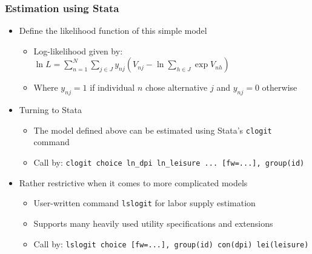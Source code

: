 \documentclass[handout,intlimits]{beamer}
\def\litc#1{\textcolor{med-gray}{\tiny\citep{#1}}}
\def\blue#1{\textcolor{zewblue}{#1}}
\begin{document}
\begin{frame}[fragile]
\frametitle{Estimation using Stata}
\begin{itemize}
	\item \blue{Define the likelihood function of this simple model}
	\begin{itemize}
		\item Log-likelihood given by: $\ln L=\sum_{n=1}^N\sum_{j\in J}y_{nj}\left(V_{nj} - \ln\sum_{h\in J}\exp V_{nh}\right)$
		\smallskip
		\item Where $y_{nj}=1$ if individual $n$ chose alternative $j$ and $y_{nj}=0$ otherwise
	\end{itemize}
	\bigskip
	\item \blue{Turning to Stata}
	\begin{itemize}
		\item The model defined above can be estimated using Stata's \verb+clogit+ command
		\smallskip
		\item Call by: \verb+clogit choice ln_dpi ln_leisure ... [fw=...], group(id)+
	\end{itemize}
	\bigskip
	\item \blue{Rather restrictive when it comes to more complicated models}
	\begin{itemize}
		\item User-written command \verb+lslogit+ for labor supply estimation \litc{loeffler_2013}
		\smallskip
		\item Supports many heavily used utility specifications and extensions \litc{loeffler_etal_2014}
		\smallskip
		\item Call by: \verb+lslogit choice [fw=...], group(id) con(dpi) lei(leisure)+
	\end{itemize}
\end{itemize}
\end{frame}
\end{document}
